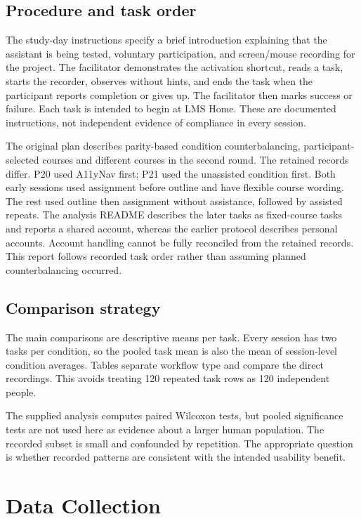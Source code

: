 \documentclass[11pt,a4paper]{article}
\begin{document}
\subsection{Procedure and task order}
The study-day instructions specify a brief introduction explaining that the assistant is being tested, voluntary participation, and screen/mouse recording for the project. The facilitator demonstrates the activation shortcut, reads a task, starts the recorder, observes without hints, and ends the task when the participant reports completion or gives up. The facilitator then marks success or failure. Each task is intended to begin at LMS Home. These are documented instructions, not independent evidence of compliance in every session.

The original plan describes parity-based condition counterbalancing, participant-selected courses and different courses in the second round. The retained records differ. P20 used A11yNav first; P21 used the unassisted condition first. Both early sessions used assignment before outline and have flexible course wording. The rest used outline then assignment without assistance, followed by assisted repeats. The analysis README describes the later tasks as fixed-course tasks and reports a shared account, whereas the earlier protocol describes personal accounts. Account handling cannot be fully reconciled from the retained records. This report follows recorded task order rather than assuming planned counterbalancing occurred.

\subsection{Comparison strategy}
The main comparisons are descriptive means per task. Every session has two tasks per condition, so the pooled task mean is also the mean of session-level condition averages. Tables separate workflow type and compare the direct recordings. This avoids treating 120 repeated task rows as 120 independent people.

The supplied analysis computes paired Wilcoxon tests, but pooled significance tests are not used here as evidence about a larger human population. The recorded subset is small and confounded by repetition. The appropriate question is whether recorded patterns are consistent with the intended usability benefit.

\section{Data Collection}
\end{document}
